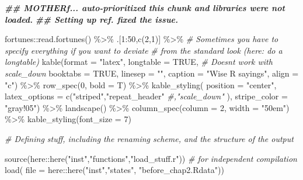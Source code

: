 \documentclass[]{elsarticle} %
\newenvironment{Shaded}{\begin{snugshade}}{\end{snugshade}}
\newcommand{\AttributeTok}[1]{\textcolor[rgb]{0.77,0.63,0.00}{#1}}
\newcommand{\CommentTok}[1]{\textcolor[rgb]{0.56,0.35,0.01}{\textit{#1}}}
\newcommand{\ConstantTok}[1]{\textcolor[rgb]{0.00,0.00,0.00}{#1}}
\newcommand{\DecValTok}[1]{\textcolor[rgb]{0.00,0.00,0.81}{#1}}
\newcommand{\DocumentationTok}[1]{\textcolor[rgb]{0.56,0.35,0.01}{\textbf{\textit{#1}}}}
\newcommand{\FunctionTok}[1]{\textcolor[rgb]{0.00,0.00,0.00}{#1}}
\newcommand{\NormalTok}[1]{#1}
\newcommand{\SpecialCharTok}[1]{\textcolor[rgb]{0.00,0.00,0.00}{#1}}
\newcommand{\StringTok}[1]{\textcolor[rgb]{0.31,0.60,0.02}{#1}}
\begin{document}
\begin{Shaded}
\begin{Highlighting}[]
\DocumentationTok{\#\# MOTHERf... auto{-}prioritized this chunk and libraries were not loaded. }
\DocumentationTok{\#\# Setting up ref. fixed the issue.}

\NormalTok{fortunes}\SpecialCharTok{::}\FunctionTok{read.fortunes}\NormalTok{() }\SpecialCharTok{\%\textgreater{}\%} 
\NormalTok{  .[}\DecValTok{1}\SpecialCharTok{:}\DecValTok{50}\NormalTok{,}\FunctionTok{c}\NormalTok{(}\DecValTok{2}\NormalTok{,}\DecValTok{1}\NormalTok{)] }\SpecialCharTok{\%\textgreater{}\%}
  \CommentTok{\# Sometimes you have to specify everything if you want to deviate}
  \CommentTok{\# from the standard look (here: do a longtable)}
  \FunctionTok{kable}\NormalTok{(}\AttributeTok{format =} \StringTok{"latex"}\NormalTok{, }
                    \AttributeTok{longtable =} \ConstantTok{TRUE}\NormalTok{, }\CommentTok{\# Doesn\textquotesingle{}t work with scale\_down}
                    \AttributeTok{booktabs =} \ConstantTok{TRUE}\NormalTok{,}
                    \AttributeTok{linesep =} \StringTok{""}\NormalTok{,}
                    \AttributeTok{caption =} \StringTok{"Wise R sayings"}\NormalTok{,}
                    \AttributeTok{align =} \StringTok{"c"}\NormalTok{) }\SpecialCharTok{\%\textgreater{}\%}
  \FunctionTok{row\_spec}\NormalTok{(}\DecValTok{0}\NormalTok{, }\AttributeTok{bold =}\NormalTok{ T) }\SpecialCharTok{\%\textgreater{}\%}
  \FunctionTok{kable\_styling}\NormalTok{( }\AttributeTok{position =} \StringTok{"center"}\NormalTok{,}
                 \AttributeTok{latex\_options =} \FunctionTok{c}\NormalTok{(}\StringTok{"striped"}\NormalTok{,}\StringTok{"repeat\_header"}
                                   \CommentTok{\#,"scale\_down"}
\NormalTok{                                   ),}
                 \AttributeTok{stripe\_color =} \StringTok{"gray!05"}\NormalTok{) }\SpecialCharTok{\%\textgreater{}\%}
  \FunctionTok{landscape}\NormalTok{() }\SpecialCharTok{\%\textgreater{}\%}
  \FunctionTok{column\_spec}\NormalTok{(}\AttributeTok{column =} \DecValTok{2}\NormalTok{, }\AttributeTok{width =} \StringTok{"50em"}\NormalTok{) }\SpecialCharTok{\%\textgreater{}\%}
  \FunctionTok{kable\_styling}\NormalTok{(}\AttributeTok{font\_size =} \DecValTok{7}\NormalTok{)}



\CommentTok{\# Defining stuff, including the renaming scheme, and the structure of the output}


\FunctionTok{source}\NormalTok{(here}\SpecialCharTok{::}\FunctionTok{here}\NormalTok{(}\StringTok{"inst"}\NormalTok{,}\StringTok{"functions"}\NormalTok{,}\StringTok{"load\_stuff.r"}\NormalTok{)) }\CommentTok{\# for independent compilation}
\FunctionTok{load}\NormalTok{( }\AttributeTok{file =}\NormalTok{ here}\SpecialCharTok{::}\FunctionTok{here}\NormalTok{(}\StringTok{"inst"}\NormalTok{,}\StringTok{"states"}\NormalTok{, }\StringTok{"before\_chap2.Rdata"}\NormalTok{))}


\end{Highlighting}
\end{Shaded}
\end{document}
